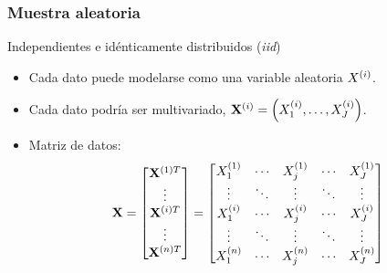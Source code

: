 \documentclass[table]{beamer}
\begin{document}
\begin{frame}
    \frametitle{Muestra aleatoria}
    \begin{block}{Independientes e idénticamente distribuidos (\emph{iid})}
        \begin{itemize}
            \item Cada dato puede modelarse como una variable aleatoria $X^{\parens{i}}$.
            \item Cada dato podría ser multivariado, $\Xvec^{\parens{i}} = \parens{X_{1}^{\parens{i}} , \ldots , X_{J}^{\parens{i}}}$.
            \item Matriz de datos:
                \begin{equation*}
                    \Xvec =
                    \begin{bmatrix}
                        \Xvec^{\parens{1} T} \\
                        \vdots \\
                        \Xvec^{\parens{i} T} \\
                        \vdots \\
                        \Xvec^{\parens{n} T}
                    \end{bmatrix}
                    =
                    \begin{bmatrix}
                        X_{1}^{\parens{1}} & \cdots & X_{j}^{\parens{1}} & \cdots & X_{J}^{\parens{1}} \\
                        \vdots & \ddots & \vdots & \ddots & \vdots \\
                        X_{1}^{\parens{i}} & \cdots & X_{j}^{\parens{i}} & \cdots & X_{J}^{\parens{i}} \\
                        \vdots & \ddots & \vdots & \ddots & \vdots \\
                        X_{1}^{\parens{n}} & \cdots & X_{j}^{\parens{n}} & \cdots & X_{J}^{\parens{n}}
                    \end{bmatrix}
                \end{equation*}
        \end{itemize}
    \end{block}
\end{frame}
\end{document}
